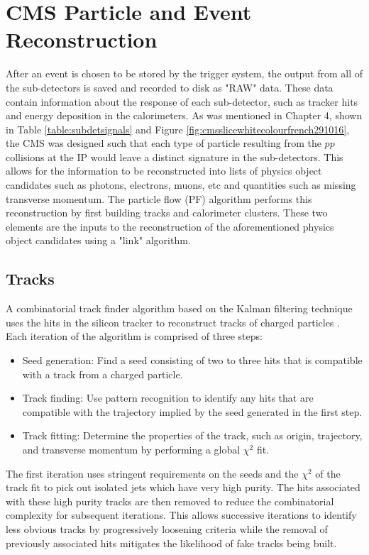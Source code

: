 \chapter{CMS Particle and Event Reconstruction}
After an event is chosen to be stored by the trigger system, the output from all of the sub-detectors is saved and recorded to disk as "RAW" data.  These data contain information about the response of each sub-detector, such as tracker hits and energy deposition in the calorimeters.  As was mentioned in Chapter 4, shown in Table \ref{table:subdetsignals} and Figure \ref{fig:cmsslicewhitecolourfrench291016}, the CMS was designed such that each type of particle resulting from the $pp$ collisions at the IP would leave a distinct signature in the sub-detectors.  This allows for the information to be reconstructed into lists of physics object candidates such as photons, electrons, muons, etc and quantities such as missing transverse momentum.  The particle flow (PF) algorithm performs this reconstruction by first building tracks and calorimeter clusters.  These two elements are the inputs to the reconstruction of the aforementioned physics object candidates using a "link" algorithm.

\section{Tracks}
A combinatorial track finder algorithm based on the Kalman filtering technique uses the hits in the silicon tracker to reconstruct tracks of charged particles \cite{Kalmantracking:1987fm}.  Each iteration of the algorithm is comprised of three steps:
\begin{itemize}
	\item Seed generation:  Find a seed consisting of two to three hits that is compatible with a track from a charged particle.
	\item Track finding: Use pattern recognition to identify any hits that are compatible with the trajectory implied by the seed generated in the first step.
	\item Track fitting: Determine the properties of the track, such as origin, trajectory, and transverse momentum by performing a global $\chi^2$ fit.
\end{itemize}

The first iteration uses stringent requirements on the seeds and the $\chi^2$ of the track fit to pick out isolated jets which have very high purity.  The hits associated with these high purity tracks are then removed to reduce the combinatorial complexity for subsequent iterations.  This allows successive iterations to identify less obvious tracks by progressively loosening criteria while the removal of previously associated hits mitigates the likelihood of fake tracks being built.  


